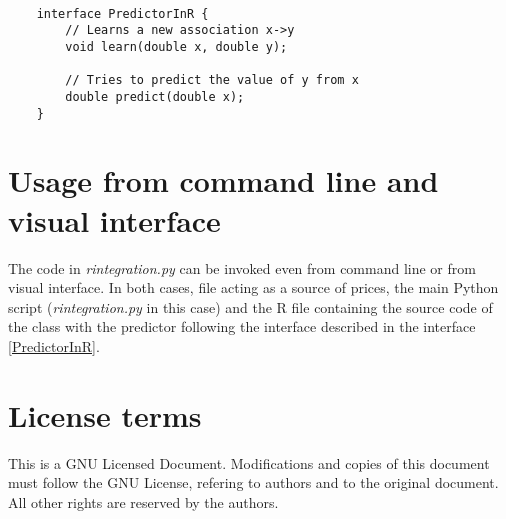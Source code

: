 \documentclass[11pt,a4paper]{article}
\begin{document}
\lstset{language=Java,frame=single,tabsize=4,basicstyle=\tiny}
\begin{lstlisting}

    interface PredictorInR {
        // Learns a new association x->y
        void learn(double x, double y);

        // Tries to predict the value of y from x
        double predict(double x);
    }

\end{lstlisting}
\label{PredictorInR}



\section{Usage from command line and visual interface}

The code in \emph{rintegration.py} can be invoked even from command line or
from visual interface. In both cases, file acting as a source of prices,
the main Python script (\emph{rintegration.py} in this case) and the R file
containing the source code of the class with the predictor following the 
interface described in the interface \ref{PredictorInR}.


\section{License terms}

This is a GNU Licensed Document. Modifications and copies of this document
must follow the GNU License, refering to authors and to the original document.
All other rights are reserved by the authors.
\end{document}
